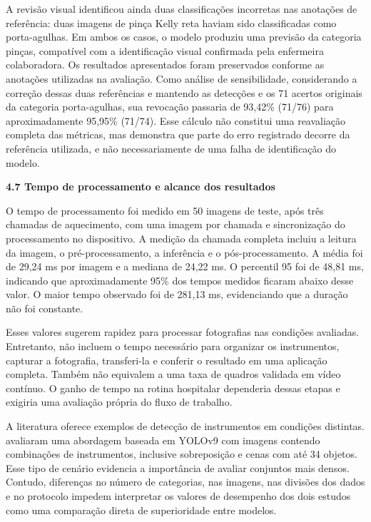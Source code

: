 A revisão visual identificou ainda duas classificações incorretas nas anotações de referência: duas imagens de pinça Kelly reta haviam sido classificadas como porta-agulhas. Em ambos os casos, o modelo produziu uma previsão da categoria pinças, compatível com a identificação visual confirmada pela enfermeira colaboradora. Os resultados apresentados foram preservados conforme as anotações utilizadas na avaliação. Como análise de sensibilidade, considerando a correção dessas duas referências e mantendo as detecções e os 71 acertos originais da categoria porta-agulhas, sua revocação passaria de 93,42\% (71/76) para aproximadamente 95,95\% (71/74). Esse cálculo não constitui uma reavaliação completa das métricas, mas demonstra que parte do erro registrado decorre da referência utilizada, e não necessariamente de uma falha de identificação do modelo.

\vspace{\baselineskip}
{}
\noindent\textbf{4.7 Tempo de processamento e alcance dos resultados}\par
\nobreak\vspace{\baselineskip}\nobreak

O tempo de processamento foi medido em 50 imagens de teste, após três chamadas de aquecimento, com uma imagem por chamada e sincronização do processamento no dispositivo. A medição da chamada completa incluiu a leitura da imagem, o pré-processamento, a inferência e o pós-processamento. A média foi de 29,24 ms por imagem e a mediana de 24,22 ms. O percentil 95 foi de 48,81 ms, indicando que aproximadamente 95\% dos tempos medidos ficaram abaixo desse valor. O maior tempo observado foi de 281,13 ms, evidenciando que a duração não foi constante.

Esses valores sugerem rapidez para processar fotografias nas condições avaliadas. Entretanto, não incluem o tempo necessário para organizar os instrumentos, capturar a fotografia, transferi-la e conferir o resultado em uma aplicação completa. Também não equivalem a uma taxa de quadros validada em vídeo contínuo. O ganho de tempo na rotina hospitalar dependeria dessas etapas e exigiria uma avaliação própria do fluxo de trabalho.

A literatura oferece exemplos de detecção de instrumentos em condições distintas. \textcite{deol2024} avaliaram uma abordagem baseada em YOLOv9 com imagens contendo combinações de instrumentos, inclusive sobreposição e cenas com até 34 objetos. Esse tipo de cenário evidencia a importância de avaliar conjuntos mais densos. Contudo, diferenças no número de categorias, nas imagens, nas divisões dos dados e no protocolo impedem interpretar os valores de desempenho dos dois estudos como uma comparação direta de superioridade entre modelos.


